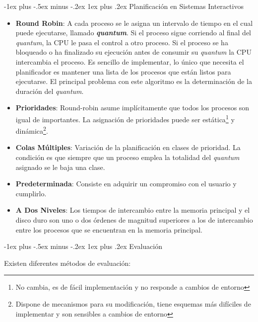 \documentclass[10pt,portrait, twocolumn]{article}
\makeatletter
\renewcommand{\subsubsection}{\@startsection{subsubsection}{3}{0mm}%
                                {-1ex plus -.5ex minus -.2ex}%
                                {1ex plus .2ex}%
                                {\normalfont\small\bfseries}}
\makeatother
\begin{document}
\subsubsection{Planificación en Sistemas Interactivos}

\begin{itemize}
	\item 	\textbf{Round Robin}: A cada proceso se le asigna un intervalo de tiempo en el cual puede ejecutarse, llamado \textbf{\textit{quantum}}. Si el proceso sigue corriendo al final del \textit{quantum}, la CPU le pasa el control a otro proceso. Si el proceso se ha bloqueado o ha finalizado su ejecución antes de consumir su \textit{quantum} la CPU intercambia el proceso. Es sencillo de implementar, lo único que necesita el planificador es mantener una lista de los procesos que están listos para ejecutarse. El principal problema con este algoritmo es la determinación de la duración del \textit{quantum}.
	\item \textbf{Prioridades}: Round-robin asume implícitamente que todos los procesos son igual de importantes. La asignación de prioridades puede ser estática\footnote{No cambia, es de fácil implementación y no responde a cambios de entorno} y dinámica\footnote{Dispone de mecanismos para su modificación, tiene esquemas más difíciles de implementar y son sensibles a cambios de entorno}.
	\item \textbf{Colas Múltiples}: Variación de la planificación en clases de prioridad. La condición es que siempre que un proceso emplea la totalidad del \textit{quantum} asignado se le baja una clase.
	\item \textbf{Predeterminada}: Consiste en adquirir un compromiso con el usuario y cumplirlo.
	\item \textbf{A Dos Niveles}: Los tiempos de intercambio entre la memoria principal y el disco duro son uno o dos órdenes de magnitud superiores a los de intercambio entre los procesos que se encuentran en la memoria principal.
\end{itemize}
	
\subsubsection{Evaluación}

Existen diferentes métodos de evaluación:
\end{document}
